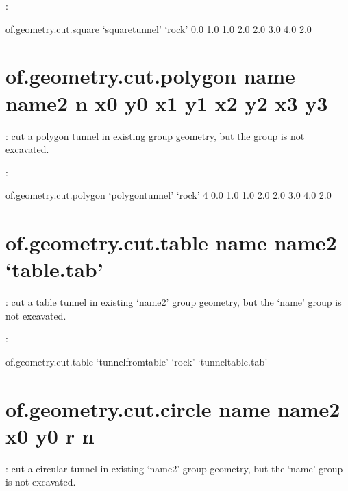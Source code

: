\documentclass[letterpaper,10pt,english]{sphinxmanual}
\begin{document}
:

\begin{sphinxVerbatim}[commandchars=\\\{\}]
of.geometry.cut.square ‘square\PYGZus{}tunnel’ ‘rock’ 0.0 1.0 1.0 2.0 2.0 3.0 4.0 2.0
\end{sphinxVerbatim}


\section{of.geometry.cut.polygon name name2 n x0 y0 x1 y1 x2 y2 x3 y3}
\label{\detokenize{rst_tutorials/command_line_guide:of-geometry-cut-polygon-name-name2-n-x0-y0-x1-y1-x2-y2-x3-y3}}
: cut a polygon tunnel in existing  group geometry, but
the  group is not excavated.

:

\begin{sphinxVerbatim}[commandchars=\\\{\}]
of.geometry.cut.polygon ‘polygon\PYGZus{}tunnel’ ‘rock’ 4 0.0 1.0 1.0 2.0 2.0 3.0 4.0 2.0
\end{sphinxVerbatim}


\section{of.geometry.cut.table name name2 ‘table.tab’}
\label{\detokenize{rst_tutorials/command_line_guide:of-geometry-cut-table-name-name2-table-tab}}
: cut a table tunnel in existing ‘name2’ group geometry, but the
‘name’ group is not excavated.

:

\begin{sphinxVerbatim}[commandchars=\\\{\}]
of.geometry.cut.table ‘tunnel\PYGZus{}from\PYGZus{}table’ ‘rock’ ‘tunneltable.tab’
\end{sphinxVerbatim}


\section{of.geometry.cut.circle name name2 x0 y0 r n}
\label{\detokenize{rst_tutorials/command_line_guide:of-geometry-cut-circle-name-name2-x0-y0-r-n}}
: cut a circular tunnel in existing ‘name2’ group geometry, but the
‘name’ group is not excavated.
\end{document}
